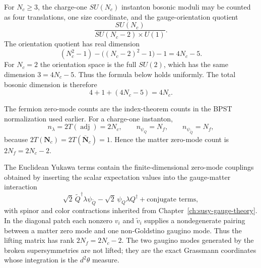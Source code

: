 For \(N_c\geq3\), the charge-one \(SU(N_c)\) instanton bosonic moduli may be
counted as four translations, one size coordinate, and the gauge-orientation
quotient
\[
  \frac{SU(N_c)}{SU(N_c-2)\times U(1)} .
\]
The orientation quotient has real dimension
\[
  (N_c^2-1)-\bigl((N_c-2)^2-1\bigr)-1
  =
  4N_c-5 .
\]
For \(N_c=2\) the orientation space is the full \(SU(2)\), which has the
same dimension \(3=4N_c-5\).  Thus the formula below holds uniformly.
The total bosonic dimension is therefore
\[
  4+1+(4N_c-5)=4N_c .
\]

The fermion zero-mode counts are the index-theorem counts in the BPST
normalization used earlier.  For a charge-one instanton,
\[
  n_{\lambda}=2T(\operatorname{adj})=2N_c,
  \qquad
  n_{\psi_Q}=N_f,\qquad
  n_{\psi_{\widetilde Q}}=N_f,
\]
because \(2T(\mathbf N_c)=2T(\overline{\mathbf N}_c)=1\).  Hence the matter
zero-mode count is \(2N_f=2N_c-2\).

The Euclidean Yukawa terms contain the finite-dimensional zero-mode
couplings obtained by inserting the scalar expectation values into the
gauge-matter interaction
\begin{equation}
  \sqrt2\,\widetilde Q^\dagger\lambda\psi_{\widetilde Q}
  -
  \sqrt2\,\psi_Q\lambda Q^\dagger
  +\text{conjugate terms},
  \label{eq:ads-yukawa-lifting-zero-mode-coupling}
\end{equation}
with spinor and color contractions inherited from
Chapter~\ref{ch:susy-gauge-theory}.  In the diagonal patch each nonzero
\(v_i\) and \(\widetilde v_i\) supplies a nondegenerate pairing between a
matter zero mode and one non-Goldstino gaugino mode.  Thus the lifting matrix
has rank \(2N_f=2N_c-2\).  The two gaugino modes generated by the broken
supersymmetries are not lifted; they are the exact Grassmann coordinates
whose integration is the \(d^2\theta\) measure.

